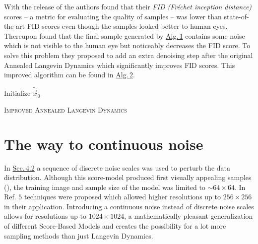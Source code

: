 With the release of \cite{score_1} the authors found that their \textit{FID (Fréchet inception distance)} \cite{fid} scores – a metric for evaluating the quality of samples – was lower than state-of-the-art FID scores even though the samples looked better to human eyes. Thereupon \cite{score_4} found that the final sample generated by \hyperref[alg:1]{Alg.\,1} contains some noise which is not visible to the human eye but noticeably decreases the FID score. To solve this problem they proposed to add an extra denoising step after the original Annealed Langevin Dynamics which significantly improves FID scores. This improved algorithm can be found in \hyperref[alg:2]{Alg.\,2}.
%
\begin{algorithm} \label{alg:2}
    \DontPrintSemicolon
    Initialize $\tilde{\vec{x}}_0$\;
    
    \caption{\textsc{Improved Annealed Langevin Dynamics}}
\end{algorithm}
\section[The way to continuous noise]{The way to continuous noise%
    } \label{sec:4.3}
In \hyperref[sec:4.2]{Sec.\,4.2} a sequence of discrete noise scales was used to perturb the data distribution. Although this score-model produced first visually appealing samples (\cite{score_1}), the training image and sample size of the model was limited to $\sim64\times64$. In Ref. \cite{score_2} $5$ techniques were proposed which allowed higher resolutions up to $256\times256$ in their application. Introducing a continuous noise instead of discrete noise scales allows for resolutions up to $1024\times1024$, a mathematically pleasant generalization of different Score-Based Models and creates the possibility for a lot more sampling methods than just Langevin Dynamics.
%
